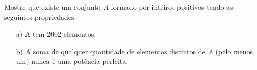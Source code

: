 Mostre que existe um conjunto $A$ formado por inteiros positivos tendo as seguintes propriedades:
\begin{itemize}
\item[a)] A tem $2002$ elementos.
\item[b)] A soma de qualquer quantidade de elementos distintos de $A$ (pelo menos um) nunca é uma potência perfeita.
\end{itemize}

